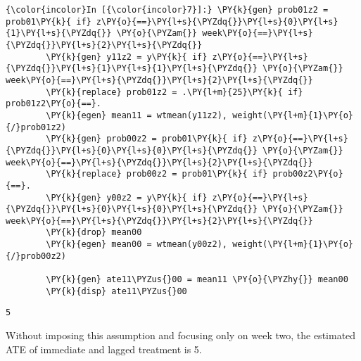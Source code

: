\documentclass[11pt,notitlepage]{article}\usepackage[]{graphicx}\usepackage[]{color}
\makeatletter
\newenvironment{kframe}{%
 \def\at@end@of@kframe{}%
 \ifinner\ifhmode%
  \def\at@end@of@kframe{\end{minipage}}%
  \begin{minipage}{\columnwidth}%
 \fi\fi%
 \def\FrameCommand##1{\hskip\@totalleftmargin \hskip-\fboxsep
 \colorbox{shadecolor}{##1}\hskip-\fboxsep
     \hskip-\linewidth \hskip-\@totalleftmargin \hskip\columnwidth}%
 \MakeFramed {\advance\hsize-\width
   \@totalleftmargin\z@ \linewidth\hsize
   \@setminipage}}%
 {\par\unskip\endMakeFramed%
 \at@end@of@kframe}
\newenvironment{knitrout}{}{} %
\makeatother
\begin{document}
\begin{enumerate}[a)]
\begin{knitrout}
\color{fgcolor}\begin{kframe}
   \begin{Verbatim}[commandchars=\\\{\}]
{\color{incolor}In [{\color{incolor}7}]:} \PY{k}{gen} prob01z2 = prob01\PY{k}{ if} z\PY{o}{==}\PY{l+s}{\PYZdq{}}\PY{l+s}{0}\PY{l+s}{1}\PY{l+s}{\PYZdq{}} \PY{o}{\PYZam{}} week\PY{o}{==}\PY{l+s}{\PYZdq{}}\PY{l+s}{2}\PY{l+s}{\PYZdq{}}
        \PY{k}{gen} y11z2 = y\PY{k}{ if} z\PY{o}{==}\PY{l+s}{\PYZdq{}}\PY{l+s}{1}\PY{l+s}{1}\PY{l+s}{\PYZdq{}} \PY{o}{\PYZam{}} week\PY{o}{==}\PY{l+s}{\PYZdq{}}\PY{l+s}{2}\PY{l+s}{\PYZdq{}}
        \PY{k}{replace} prob01z2 = .\PY{l+m}{25}\PY{k}{ if} prob01z2\PY{o}{==}.
        \PY{k}{egen} mean11 = wtmean(y11z2), weight(\PY{l+m}{1}\PY{o}{/}prob01z2)
        \PY{k}{gen} prob00z2 = prob01\PY{k}{ if} z\PY{o}{==}\PY{l+s}{\PYZdq{}}\PY{l+s}{0}\PY{l+s}{0}\PY{l+s}{\PYZdq{}} \PY{o}{\PYZam{}} week\PY{o}{==}\PY{l+s}{\PYZdq{}}\PY{l+s}{2}\PY{l+s}{\PYZdq{}}
        \PY{k}{replace} prob00z2 = prob01\PY{k}{ if} prob00z2\PY{o}{==}.
        \PY{k}{gen} y00z2 = y\PY{k}{ if} z\PY{o}{==}\PY{l+s}{\PYZdq{}}\PY{l+s}{0}\PY{l+s}{0}\PY{l+s}{\PYZdq{}} \PY{o}{\PYZam{}} week\PY{o}{==}\PY{l+s}{\PYZdq{}}\PY{l+s}{2}\PY{l+s}{\PYZdq{}}
        \PY{k}{drop} mean00
        \PY{k}{egen} mean00 = wtmean(y00z2), weight(\PY{l+m}{1}\PY{o}{/}prob00z2)
        
        \PY{k}{gen} ate11\PYZus{}00 = mean11 \PY{o}{\PYZhy{}} mean00
        \PY{k}{disp} ate11\PYZus{}00
\end{Verbatim}

    \begin{Verbatim}[commandchars=\\\{\}]
5
    \end{Verbatim}
\end{kframe}
\end{knitrout}

Without imposing this assumption and focusing only on week two, the estimated ATE of immediate and lagged treatment is 5.
\end{enumerate}
\end{document}
